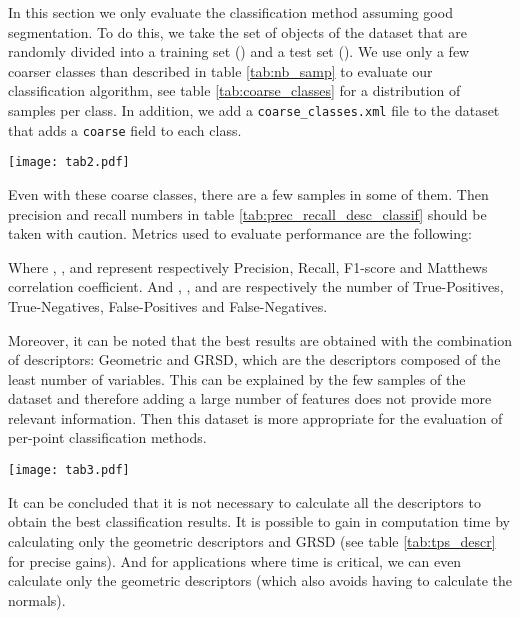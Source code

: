 \documentclass[a4paper, 10pt, journal]{article}
\begin{document}
In this section we only evaluate the classification method assuming good segmentation. To do this, we take the set of objects of the dataset that are randomly divided into a training set () and a test set ().
We use only a few coarser classes than described in table \ref{tab:nb_samp} to evaluate our classification algorithm, see table \ref{tab:coarse_classes} for a distribution of samples per class. In addition, we add a \texttt{coarse\_classes.xml} file to the dataset that adds a \texttt{coarse} field to each class.

\begin{center}
 \texttt{[image: tab2.pdf]}
\end{center}

Even with these coarse classes, there are a few samples in some of them. Then precision and recall numbers in table \ref{tab:prec_recall_desc_classif} should be taken with caution. Metrics used to evaluate performance are the following:

Where , ,  and  represent respectively Precision, Recall, F1-score and Matthews correlation coefficient. And , ,  and  are respectively the number of True-Positives, True-Negatives, False-Positives and False-Negatives.

 Moreover, it can be noted that the best results are obtained with the combination of descriptors: Geometric and GRSD, which are the descriptors composed of the least number of variables. 
This can be explained by the few samples of the dataset and therefore adding a large number of features does not provide more relevant information.
Then this dataset is more appropriate for the evaluation of per-point classification methods.
  
\begin{center}
 \texttt{[image: tab3.pdf]}
\end{center}

It can be concluded that it is not necessary to calculate all the descriptors to obtain the best classification results. It is possible to gain in computation time by calculating only the geometric descriptors and GRSD (see table \ref{tab:tps_descr} for precise gains). And for applications where time is critical, we can even calculate only the geometric descriptors (which also avoids having to calculate the normals).
\end{document}
